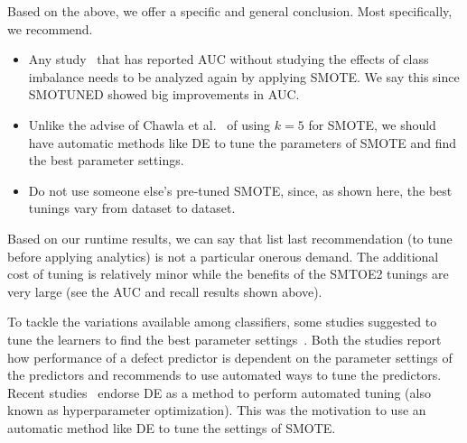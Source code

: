 \documentclass[10pt,conference]{IEEEtran}
\newcommand{\bi}{\begin{itemize}[leftmargin=0.4cm]}
\newcommand{\ei}{\end{itemize}}
\theoremstyle{break}
\theoremstyle{break}
\begin{document}
Based on the above, we offer a specific and general conclusion. Most specifically, we recommend.
\bi
 \item Any study~\cite{ghotra2015revisiting} that has reported AUC without studying the effects of class imbalance needs to be analyzed again by applying SMOTE. We say this since SMOTUNED showed big improvements in AUC.
 \item Unlike the advise of Chawla et al.~\cite{chawla2002smote} of using $k=5$ for SMOTE, we should have automatic methods like DE to tune the parameters of SMOTE and find the best parameter settings.
 \item Do not use someone else's pre-tuned SMOTE, since, as shown here, the best tunings vary from dataset to dataset.
\ei
Based on our runtime results, we can say that list last
recommendation (to tune before applying analytics) is not  a particular
onerous demand. The additional cost of tuning
is relatively minor while the benefits of the SMTOE2 tunings
are very large (see the   AUC and recall results shown above).




\balance



%
\medskip
 


To tackle the variations available among classifiers, some studies suggested to tune the learners to find the best parameter settings~\cite{tantithamthavorn2016automated, fu2016tuning}.  Both the studies report how performance of a defect predictor is dependent on the parameter settings of the predictors and recommends to use automated ways to tune the predictors.
Recent studies~\cite{fu2016tuning, agrawal2016wrong} endorse DE as a method to perform automated tuning (also known as hyperparameter optimization). This was the motivation to use an automatic method like DE to
tune the settings of SMOTE.
\end{document}
